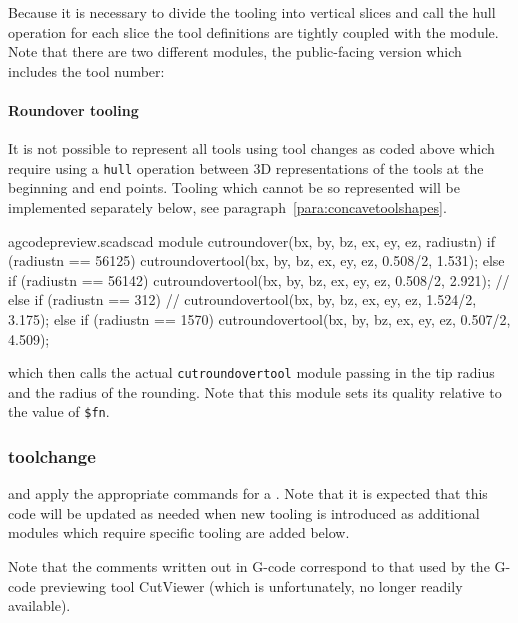\documentclass{ltxdoc}
\begin{document}
Because it is necessary to divide the tooling into vertical slices and call the hull operation for each slice the tool definitions are tightly coupled with the module. Note that there are two different modules, the public-facing version which includes the tool number:

\paragraph{Roundover tooling}

\label{para:roundover} It is not possible to represent all tools using tool changes as coded above which require using a \texttt{hull} operation between 3D representations of the tools at the beginning and end points. Tooling which cannot be so represented will be implemented separately below, see paragraph~\ref{para:concavetoolshapes}.

\lstset{firstnumber=\thegcpscad}
\begin{writecode}{a}{gcodepreview.scad}{scad}
module cutroundover(bx, by, bz, ex, ey, ez, radiustn) {
    if (radiustn == 56125) {
        cutroundovertool(bx, by, bz, ex, ey, ez, 0.508/2, 1.531);
    } else if (radiustn == 56142) {
        cutroundovertool(bx, by, bz, ex, ey, ez, 0.508/2, 2.921);
//    } else if (radiustn == 312) {
//        cutroundovertool(bx, by, bz, ex, ey, ez, 1.524/2, 3.175);
    } else if (radiustn == 1570) {
        cutroundovertool(bx, by, bz, ex, ey, ez, 0.507/2, 4.509);
    }
}

\end{writecode}
\addtocounter{gcpscad}{12}

\noindent which then calls the actual \texttt{cutroundovertool} module passing in the tip radius and the radius of the rounding. Note that this module sets its quality relative to the value of \verb|$fn|.

\subsubsection{toolchange}

\noindent and apply the appropriate commands for a \label{subsubsec:toolchange} . Note that it is expected that this code will be updated as needed when new tooling is introduced as additional modules which require specific tooling are added below. 

Note that the comments written out in G-code correspond to that used by the G-code previewing tool CutViewer (which is unfortunately, no longer readily available).
\end{document}
